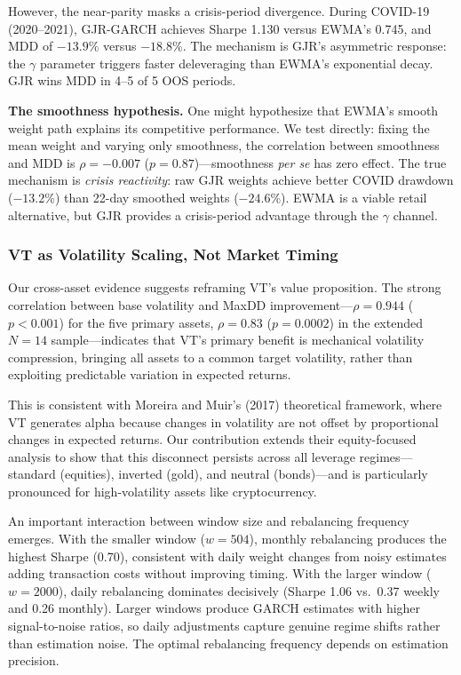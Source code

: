 However, the near-parity masks a crisis-period divergence. During COVID-19 (2020--2021), GJR-GARCH achieves Sharpe 1.130 versus EWMA's 0.745, and MDD of $-13.9\%$ versus $-18.8\%$. The mechanism is GJR's asymmetric response: the $\gamma$ parameter triggers faster deleveraging than EWMA's exponential decay. GJR wins MDD in 4--5 of 5 OOS periods.

\textbf{The smoothness hypothesis.} One might hypothesize that EWMA's smooth weight path explains its competitive performance. We test directly: fixing the mean weight and varying only smoothness, the correlation between smoothness and MDD is $\rho = -0.007$ ($p = 0.87$)---smoothness \textit{per se} has zero effect. The true mechanism is \textit{crisis reactivity}: raw GJR weights achieve better COVID drawdown ($-13.2\%$) than 22-day smoothed weights ($-24.6\%$). EWMA is a viable retail alternative, but GJR provides a crisis-period advantage through the $\gamma$ channel.

\subsubsection{VT as Volatility Scaling, Not Market Timing}

Our cross-asset evidence suggests reframing VT's value proposition. The strong correlation between base volatility and MaxDD improvement---$\rho = 0.944$ ($p < 0.001$) for the five primary assets, $\rho = 0.83$ ($p = 0.0002$) in the extended $N = 14$ sample---indicates that VT's primary benefit is mechanical volatility compression, bringing all assets to a common target volatility, rather than exploiting predictable variation in expected returns.

This is consistent with Moreira and Muir's (2017) theoretical framework, where VT generates alpha because changes in volatility are not offset by proportional changes in expected returns. Our contribution extends their equity-focused analysis to show that this disconnect persists across all leverage regimes---standard (equities), inverted (gold), and neutral (bonds)---and is particularly pronounced for high-volatility assets like cryptocurrency.

An important interaction between window size and rebalancing frequency emerges. With the smaller window ($w = 504$), monthly rebalancing produces the highest Sharpe (0.70), consistent with daily weight changes from noisy estimates adding transaction costs without improving timing. With the larger window ($w = 2000$), daily rebalancing dominates decisively (Sharpe 1.06 vs.\ 0.37 weekly and 0.26 monthly). Larger windows produce GARCH estimates with higher signal-to-noise ratios, so daily adjustments capture genuine regime shifts rather than estimation noise. The optimal rebalancing frequency depends on estimation precision.


